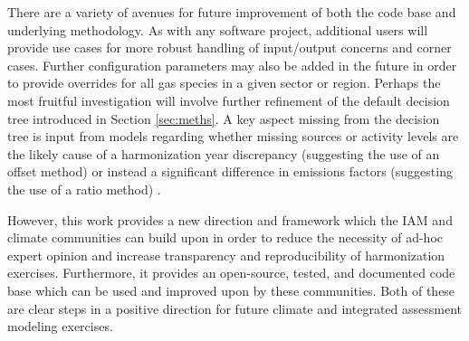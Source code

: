 There are a variety of avenues for future improvement of both the 
code base and underlying methodology. As with any software project, additional
users will provide use cases for more robust handling of input/output concerns
and corner cases. Further configuration parameters may also be added in the
future in order to provide overrides for all gas species in a given sector or
region. Perhaps the most fruitful investigation will involve further refinement
of the default decision tree introduced in Section \ref{sec:meths}. A key aspect
missing from the decision tree is input from models regarding whether missing
sources or activity levels are the likely cause of a harmonization year
discrepancy (suggesting the
% 
% 
use of an offset method) or instead a significant difference in emissions
% 
% 
factors (suggesting the use of a ratio method) \cite{rogelj_discrepancies_2011}.

However, this work provides a new direction and framework which the IAM and
climate communities can build upon in order to reduce the necessity of ad-hoc
expert opinion and increase transparency and reproducibility of harmonization
exercises. Furthermore, it provides an open-source, tested, and documented code
base which can be used and improved upon by these communities. Both of these are
clear steps in a positive direction for future climate and integrated assessment
modeling exercises.
